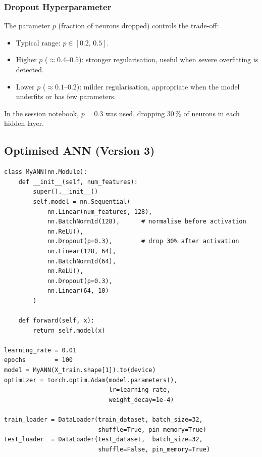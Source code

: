 \documentclass[12pt,a4paper]{article}
\newcommand{\Ltwo}{L_2}
\begin{document}
\subsubsection{Dropout Hyperparameter}
\label{sec:regularisation:dropout:hyperparam}

The parameter $p$ (fraction of neurons dropped) controls the trade-off:

\begin{itemize}
  \item Typical range: $p \in [0.2,\, 0.5]$.
  \item Higher $p$ ($\approx 0.4$--$0.5$): stronger regularisation, useful
        when severe overfitting is detected.
  \item Lower $p$ ($\approx 0.1$--$0.2$): milder regularisation, appropriate
        when the model underfits or has few parameters.
\end{itemize}

In the session notebook, $p = 0.3$ was used, dropping 30\,\% of neurons
in each hidden layer.

\subsection{Optimised ANN (Version 3)}
\label{sec:regularisation:v3}

\begin{example}[title=Optimised ANN (Version 3 -- BatchNorm + Dropout + $\Ltwo$)]
\begin{verbatim}
class MyANN(nn.Module):
    def __init__(self, num_features):
        super().__init__()
        self.model = nn.Sequential(
            nn.Linear(num_features, 128),
            nn.BatchNorm1d(128),      # normalise before activation
            nn.ReLU(),
            nn.Dropout(p=0.3),        # drop 30% after activation
            nn.Linear(128, 64),
            nn.BatchNorm1d(64),
            nn.ReLU(),
            nn.Dropout(p=0.3),
            nn.Linear(64, 10)
        )

    def forward(self, x):
        return self.model(x)

learning_rate = 0.01
epochs        = 100
model = MyANN(X_train.shape[1]).to(device)
optimizer = torch.optim.Adam(model.parameters(),
                             lr=learning_rate,
                             weight_decay=1e-4)

train_loader = DataLoader(train_dataset, batch_size=32,
                          shuffle=True, pin_memory=True)
test_loader  = DataLoader(test_dataset,  batch_size=32,
                          shuffle=False, pin_memory=True)
\end{verbatim}
\end{example}
\end{document}
